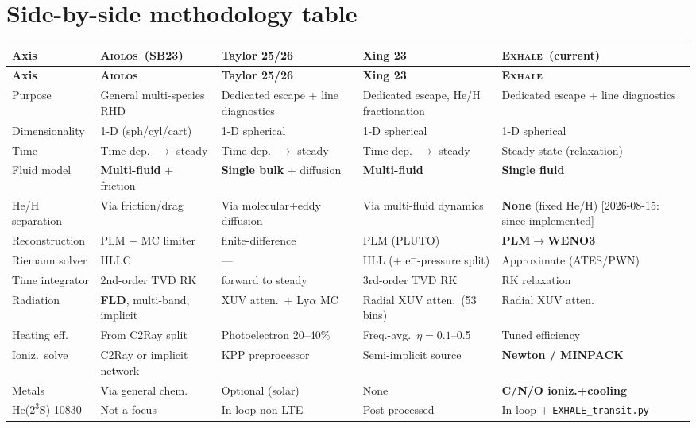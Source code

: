 \documentclass[11pt]{article}
\newcommand{\EXHALE}{\textsc{Exhale}}
\newcommand{\AIOLOS}{\textsc{Aiolos}}
\begin{document}
\section{Side-by-side methodology table}

\renewcommand{\arraystretch}{1.25}
\footnotesize
\begin{longtable}{p{2.3cm} p{2.7cm} p{2.9cm} p{2.7cm} p{2.9cm}}
\toprule
\textbf{Axis} & \textbf{\AIOLOS\ (SB23)} & \textbf{Taylor 25/26} & \textbf{Xing 23} & \textbf{\EXHALE\ (current)} \\
\midrule
\endfirsthead
\toprule
\textbf{Axis} & \textbf{\AIOLOS} & \textbf{Taylor 25/26} & \textbf{Xing 23} & \textbf{\EXHALE} \\
\midrule
\endhead
Purpose & General multi-species RHD & Dedicated escape + line diagnostics & Dedicated escape, He/H fractionation & Dedicated escape + line diagnostics \\
Dimensionality & 1-D (sph/cyl/cart) & 1-D spherical & 1-D spherical & 1-D spherical \\
Time & Time-dep.\ $\to$ steady & Time-dep.\ $\to$ steady & Time-dep.\ $\to$ steady & Steady-state (relaxation) \\
Fluid model & \textbf{Multi-fluid} + friction & \textbf{Single bulk} + diffusion & \textbf{Multi-fluid} & \textbf{Single fluid} \\
He/H separation & Via friction/drag & Via molecular+eddy diffusion & Via multi-fluid dynamics & \textbf{None} (fixed He/H) [2026-08-15: since implemented] \\
Reconstruction & PLM + MC limiter & finite-difference & PLM (PLUTO) & \textbf{PLM$\to$WENO3} \\
Riemann solver & HLLC & --- & HLL (+ e$^-$-pressure split) & Approximate (ATES/PWN) \\
Time integrator & 2nd-order TVD RK & forward to steady & 3rd-order TVD RK & RK relaxation \\
Radiation & \textbf{FLD}, multi-band, implicit & XUV atten.\ + Ly$\alpha$ MC & Radial XUV atten.\ (53 bins) & Radial XUV atten. \\
Heating eff. & From C2Ray split & Photoelectron 20--40\% & Freq.-avg.\ $\eta=0.1$--0.5 & Tuned efficiency \\
Ioniz.\ solve & C2Ray or implicit network & KPP preprocessor & Semi-implicit source & \textbf{Newton / MINPACK} \\
Metals & Via general chem.\ & Optional (solar) & None & \textbf{C/N/O ioniz.+cooling} \\
He($2^3$S) 10830 & Not a focus & In-loop non-LTE & Post-processed & In-loop + \texttt{EXHALE\_transit.py} \\

\end{longtable}
\end{document}
